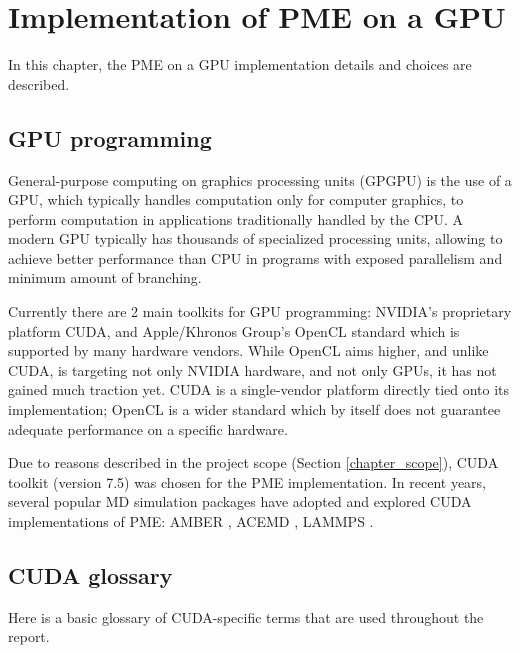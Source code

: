 \documentclass[12pt,a4paper,notitlepage]{report}
\newcommand{\draft}[1]{#1}
\begin{document}
\newpage
\chapter{Implementation of PME on a GPU}

In this chapter, the PME on a GPU implementation details and choices are described.

\section{GPU programming}

General-purpose computing on graphics processing units (GPGPU) is the use of a GPU, which typically handles computation only for computer graphics, to perform computation in applications traditionally handled by the CPU. A modern GPU typically has thousands of specialized processing units, allowing to achieve better performance than CPU in programs with exposed parallelism and minimum amount of branching. %

Currently there are 2 main toolkits for GPU programming: NVIDIA's proprietary platform CUDA, and Apple/Khronos Group's OpenCL standard which is supported by many hardware vendors. While OpenCL aims higher, and unlike CUDA, is targeting not only NVIDIA hardware, and not only GPUs, it has not gained much traction yet. CUDA is a single-vendor platform directly tied onto its implementation; OpenCL is a wider standard which by itself does not guarantee adequate performance on a specific hardware.

Due to reasons described in the project scope (Section \ref{chapter_scope}), CUDA toolkit (version 7.5) was chosen for the PME implementation. In recent years, several popular MD simulation packages have adopted and explored CUDA implementations of PME: AMBER \cite{amber}, ACEMD \cite{acemd}, LAMMPS \cite{lammps}.


\section{CUDA glossary}
Here is a basic glossary of CUDA-specific terms that are used throughout the report.
 
\end{document}

